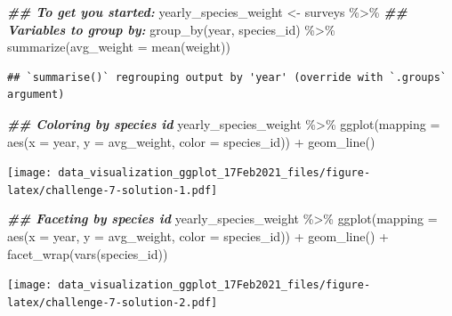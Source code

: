 \documentclass[
]{article}
\newenvironment{Shaded}{\begin{snugshade}}{\end{snugshade}}
\newcommand{\AttributeTok}[1]{\textcolor[rgb]{0.77,0.63,0.00}{#1}}
\newcommand{\DocumentationTok}[1]{\textcolor[rgb]{0.56,0.35,0.01}{\textbf{\textit{#1}}}}
\newcommand{\FunctionTok}[1]{\textcolor[rgb]{0.00,0.00,0.00}{#1}}
\newcommand{\NormalTok}[1]{#1}
\newcommand{\OtherTok}[1]{\textcolor[rgb]{0.56,0.35,0.01}{#1}}
\newcommand{\SpecialCharTok}[1]{\textcolor[rgb]{0.00,0.00,0.00}{#1}}
\begin{document}
\begin{Shaded}
\begin{Highlighting}[]
\DocumentationTok{\#\# To get you started:  }
\NormalTok{yearly\_species\_weight }\OtherTok{\textless{}{-}}\NormalTok{ surveys }\SpecialCharTok{\%\textgreater{}\%} 
  \DocumentationTok{\#\# Variables to group by:}
  \FunctionTok{group\_by}\NormalTok{(year, species\_id) }\SpecialCharTok{\%\textgreater{}\%}
  \FunctionTok{summarize}\NormalTok{(}\AttributeTok{avg\_weight =} \FunctionTok{mean}\NormalTok{(weight))}
\end{Highlighting}
\end{Shaded}

\begin{verbatim}
## `summarise()` regrouping output by 'year' (override with `.groups` argument)
\end{verbatim}

\begin{Shaded}
\begin{Highlighting}[]
\DocumentationTok{\#\# Coloring by species id}
\NormalTok{yearly\_species\_weight }\SpecialCharTok{\%\textgreater{}\%} 
\FunctionTok{ggplot}\NormalTok{(}\AttributeTok{mapping =} \FunctionTok{aes}\NormalTok{(}\AttributeTok{x =}\NormalTok{ year, }\AttributeTok{y =}\NormalTok{ avg\_weight, }\AttributeTok{color =}\NormalTok{ species\_id)) }\SpecialCharTok{+}
    \FunctionTok{geom\_line}\NormalTok{()}
\end{Highlighting}
\end{Shaded}

\texttt{[image: data\_visualization\_ggplot\_17Feb2021\_files/figure-latex/challenge-7-solution-1.pdf]}

\begin{Shaded}
\begin{Highlighting}[]
\DocumentationTok{\#\# Faceting by species id}
\NormalTok{yearly\_species\_weight }\SpecialCharTok{\%\textgreater{}\%} 
\FunctionTok{ggplot}\NormalTok{(}\AttributeTok{mapping =} \FunctionTok{aes}\NormalTok{(}\AttributeTok{x =}\NormalTok{ year, }\AttributeTok{y =}\NormalTok{ avg\_weight, }\AttributeTok{color =}\NormalTok{ species\_id)) }\SpecialCharTok{+}
    \FunctionTok{geom\_line}\NormalTok{() }\SpecialCharTok{+} 
  \FunctionTok{facet\_wrap}\NormalTok{(}\FunctionTok{vars}\NormalTok{(species\_id))}
\end{Highlighting}
\end{Shaded}

\texttt{[image: data\_visualization\_ggplot\_17Feb2021\_files/figure-latex/challenge-7-solution-2.pdf]}
\end{document}
